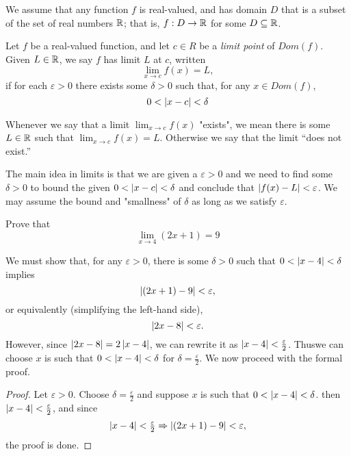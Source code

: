 We assume that any function $f$ is real-valued, and has domain $D$ that is a subset
of the set of real numbers $\mathbb{R}$; that is, $f : D \rightarrow \mathbb{R}$ for some $D \subseteq \mathbb{R}$.
\begin{defi}
    Let $f$ be a real-valued function, and let $c \in R$ be a \emph{limit point} of $Dom(f)$.
    Given $L \in \mathbb{R}$, we say $f$ has limit $L$ at $c$, written
    \begin{equation*}
         \lim_{x \to c} f(x)=L, 
    \end{equation*}
    if for each $\varepsilon >0$ there exists some $\delta >0$ such that, for 
    any $x \in Dom(f)$,
    \begin{equation*}
        0<\left\lvert x-c\right\rvert<\delta
    \end{equation*} 
\end{defi}
\begin{remark}
     Whenever we say that a limit $\lim_{x \to c} f(x)$ "exists", we mean there
     is some $L \in \mathbb{R}$ such that $\lim_{x \to c} f(x)=L$. Otherwise we say that
     the limit “does not exist.”  
\end{remark}
The main idea in limits is that we are given a $\varepsilon>0$ and we need to find 
some $\delta >0 $ to bound the given $0<\left\lvert x-c\right\rvert<\delta$ and conclude that 
$\left\lvert f(x)-L\right\rvert < \varepsilon$. We may assume the bound and "smallness" of $\delta$
 as long as we satisfy $\varepsilon$.
 \begin{eg}
      Prove that
      \begin{equation*}
          \lim_{x \to 4} (2x+1) =9
      \end{equation*}
 \end{eg}
 \begin{aim}
      We must show that, for any $\varepsilon >0$, there is some $\delta >0$ 
      such that $0<\left\lvert x-4\right\rvert<\delta$ implies
      \begin{equation*}
          \left\lvert (2x+1)-9\right\rvert<\varepsilon,
      \end{equation*}
      or equivalently (simplifying the left-hand side),
      \begin{equation*}
          \left\lvert 2x-8\right\rvert<\varepsilon.
      \end{equation*}
      However, since $\left\lvert 2x-8\right\rvert = 2\left\lvert x-4\right\rvert$, we can rewrite it as 
      $\left\lvert x-4\right\rvert<\tfrac{\varepsilon}{2}$. Thuswe can choose $x$ is such that
      $0<\left\lvert x-4\right\rvert<\delta$ for $\delta = \tfrac{\varepsilon}{2}$. We now proceed 
      with the formal proof.
 \end{aim}
 \begin{proof}
      Let $\varepsilon>0$. Choose $\delta =\tfrac{\varepsilon}{2}$ and suppose 
      $x$ is such that $0 <\left\lvert x-4\right\rvert< \delta$. then $\left\lvert x-4\right\rvert< \tfrac{\varepsilon}{2}$,
    and since 
    \begin{equation*}
        \left\lvert x-4\right\rvert < \tfrac{\varepsilon}{2} \Rightarrow \left\lvert (2x+1)-9\right\rvert< \varepsilon,
    \end{equation*}
    the proof is done.
 \end{proof}
